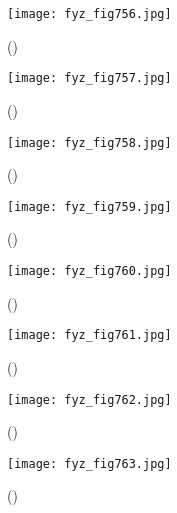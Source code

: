     \begin{figure}[ht!] %
      \centering
      \texttt{[image: fyz\_fig756.jpg]}
      \caption{
               (\cite[s.~707]{Feynman02})}
      \label{fyz_fig756}
    \end{figure}

    \begin{figure}[ht!] %
      \centering
      \texttt{[image: fyz\_fig757.jpg]}
      \caption{
               (\cite[s.~707]{Feynman02})}
      \label{fyz_fig757}
    \end{figure}

    \begin{figure}[ht!] %
      \centering
      \texttt{[image: fyz\_fig758.jpg]}
      \caption{
               (\cite[s.~707]{Feynman02})}
      \label{fyz_fig758}
    \end{figure}

    \begin{figure}[ht!] %
      \centering
      \texttt{[image: fyz\_fig759.jpg]}
      \caption{
               (\cite[s.~707]{Feynman02})}
      \label{fyz_fig759}
    \end{figure}
    
    \begin{figure}[ht!] %
      \centering
      \texttt{[image: fyz\_fig760.jpg]}
      \caption{
               (\cite[s.~707]{Feynman02})}
      \label{fyz_fig760}
    \end{figure}

    \begin{figure}[ht!] %
      \centering
      \texttt{[image: fyz\_fig761.jpg]}
      \caption{
               (\cite[s.~707]{Feynman02})}
      \label{fyz_fig761}
    \end{figure}

    \begin{figure}[ht!] %
      \centering
      \texttt{[image: fyz\_fig762.jpg]}
      \caption{
               (\cite[s.~707]{Feynman02})}
      \label{fyz_fig762}
    \end{figure}

    \begin{figure}[ht!] %
      \centering
      \texttt{[image: fyz\_fig763.jpg]}
      \caption{
               (\cite[s.~707]{Feynman02})}
      \label{fyz_fig763}
    \end{figure}

